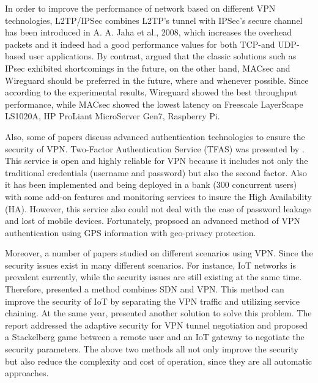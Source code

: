 \documentclass[12pt]{article} %
\begin{document}
In order to improve the performance of network based on different VPN technologies, L2TP/IPSec combines L2TP's tunnel with IPSec's secure channel has been introduced in A. A. Jaha et al., 2008, which increases the overhead packets and it indeed had a good performance values for both TCP-and UDP-based user applications. By contrast, \cite{8758010} argued that the classic solutions such as IPsec exhibited shortcomings in the future, on the other hand, MACsec and Wireguard should be preferred in the future, where and whenever possible. Since according to the experimental results, Wireguard showed the best throughput performance, while MACsec showed the lowest latency on Freescale LayerScape LS1020A, HP ProLiant MicroServer Gen7, Raspberry Pi.

Also, some of papers discuss advanced authentication technologies to ensure the security of VPN. Two-Factor Authentication Service (TFAS) was presented by \cite{6407698}. This service is open and highly reliable for VPN because it includes not only the traditional credentials (username and password) but also the second factor. Also it has been implemented and being deployed in a bank (300 concurrent users) with some add-on features and monitoring services to insure the High Availability (HA). However, this service also could not deal with the case of password leakage and lost of mobile devices. Fortunately, \cite{7568518} propsoed an advanced method of VPN authentication using GPS information with geo-privacy protection.

Moreover, a number of papers studied on different scenarios using VPN. Since the security issues exist in many different scenarios. For instance, IoT networks is prevalent currently, while the security issues are still existing at the same time. Therefore, \cite{8406192} presented a method combines SDN and VPN. This method can improve the security of IoT by separating the VPN traffic and utilizing service chaining. At the same year, \cite{8648064} presented another solution to solve this problem. The report addressed the adaptive security for VPN tunnel negotiation and proposed a Stackelberg game between a remote user and an IoT gateway to negotiate the security parameters. The above two methods all not only improve the security but also reduce the complexity and cost of operation, since they are all automatic approaches. 
\end{document}

